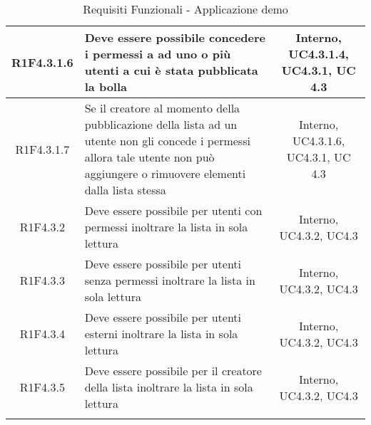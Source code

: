\begin{longtable}{|c|>{\centering}m{7cm}|c|}
			\hline
			R1F4.3.1.6 & Deve essere possibile concedere i permessi a ad uno o più utenti a cui è stata pubblicata la bolla & Interno, UC4.3.1.4, UC4.3.1, UC 4.3 \\
			\hline
			R1F4.3.1.7 & Se il creatore al momento della pubblicazione della lista ad un utente non gli concede i permessi allora tale utente non può aggiungere o rimuovere elementi dalla lista stessa & Interno, UC4.3.1.6, UC4.3.1, UC 4.3 \\
			\hline
			R1F4.3.2 & Deve essere possibile per utenti con permessi inoltrare la lista in sola lettura & Interno, UC4.3.2, UC4.3\\
			\hline
			R1F4.3.3 & Deve essere possibile per utenti senza permessi inoltrare la lista in sola lettura & Interno, UC4.3.2, UC4.3\\
			\hline
			R1F4.3.4 & Deve essere possibile per utenti esterni inoltrare la lista in sola lettura & Interno, UC4.3.2, UC4.3\\
			\hline
			R1F4.3.5 & Deve essere possibile per il creatore della lista inoltrare la lista in sola lettura & Interno, UC4.3.2, UC4.3\\
			\hline
\caption[Requisiti Funzionali - Applicazione demo]{Requisiti Funzionali - Applicazione demo}
\label{tabella: Requisiti Funzionali - Applicazione demo}
\end{longtable}
\endgroup
\clearpage